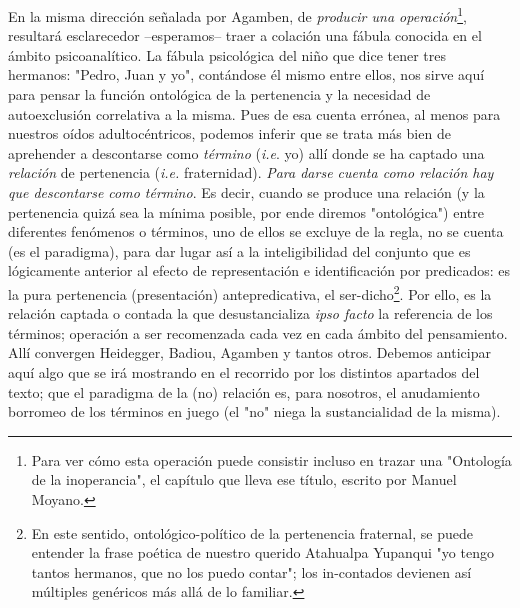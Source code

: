 En la misma dirección señalada por Agamben, de \emph{producir una
operación}\footnote{Para ver cómo esta operación puede consistir incluso
  en trazar una "Ontología de la inoperancia", el capítulo que lleva ese
  título, escrito por Manuel Moyano.}, resultará esclarecedor
--esperamos-- traer a colación una fábula conocida en el ámbito
psicoanalítico. La fábula psicológica del niño que dice tener tres
hermanos: "Pedro, Juan y yo", contándose él mismo entre ellos, nos sirve
aquí para pensar la función ontológica de la pertenencia y la necesidad
de autoexclusión correlativa a la misma. Pues de esa cuenta errónea, al
menos para nuestros oídos adultocéntricos, podemos inferir que se trata
más bien de aprehender a descontarse como \emph{término} (\emph{i.e}.
yo) allí donde se ha captado una \emph{relación} de pertenencia
(\emph{i.e.} fraternidad). \emph{Para darse cuenta como relación hay que
descontarse como término}. Es decir, cuando se produce una relación (y
la pertenencia quizá sea la mínima posible, por ende diremos
"ontológica") entre diferentes fenómenos o términos, uno de ellos se
excluye de la regla, no se cuenta (es el paradigma), para dar lugar así
a la inteligibilidad del conjunto que es lógicamente anterior al efecto
de representación e identificación por predicados: es la pura
pertenencia (presentación) antepredicativa, el ser-dicho\footnote{En
  este sentido, ontológico-político de la pertenencia fraternal, se
  puede entender la frase poética de nuestro querido Atahualpa Yupanqui
  "yo tengo tantos hermanos, que no los puedo contar"; los in-contados
  devienen así múltiples genéricos más allá de lo familiar.}. Por ello,
es la relación captada o contada la que desustancializa \emph{ipso
facto} la referencia de los términos; operación a ser recomenzada cada
vez en cada ámbito del pensamiento. Allí convergen Heidegger, Badiou,
Agamben y tantos otros. Debemos anticipar aquí algo que se irá mostrando
en el recorrido por los distintos apartados del texto; que el paradigma
de la (no) relación es, para nosotros, el anudamiento borromeo de los
términos en juego (el "no" niega la sustancialidad de la misma).

